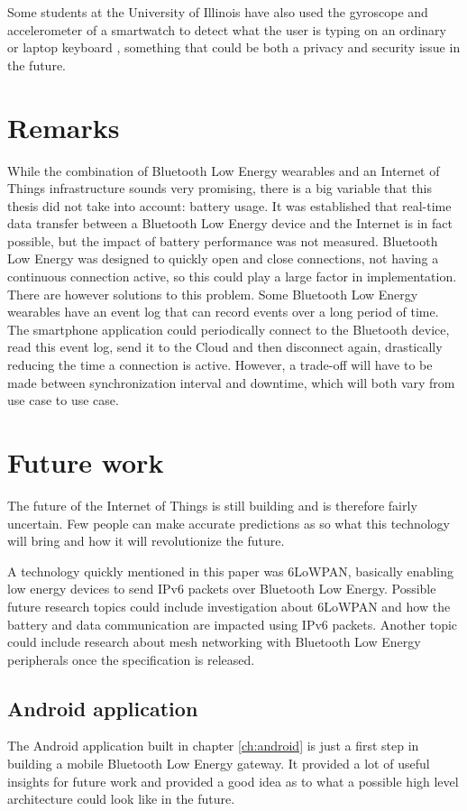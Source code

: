 \documentclass[pdftex,a4paper,12pt,twoside]{report}
\begin{document}
Some students at the University of Illinois have also used the gyroscope and accelerometer of a smartwatch to detect what the user is typing on an ordinary or laptop keyboard \citep{wang2015mole}, something that could be both a privacy and security issue in the future.

\section{Remarks}
\label{sec:remarks}
While the combination of Bluetooth Low Energy wearables and an Internet of Things infrastructure sounds very promising, there is a big variable that this thesis did not take into account: battery usage. It was established that real-time data transfer between a Bluetooth Low Energy device and the Internet is in fact possible, but the impact of battery performance was not measured. Bluetooth Low Energy was designed to quickly open and close connections, not having a continuous connection active, so this could play a large factor in implementation. There are however solutions to this problem. Some Bluetooth Low Energy wearables have an event log that can record events over a long period of time. The smartphone application could periodically connect to the Bluetooth device, read this event log, send it to the Cloud and then disconnect again, drastically reducing the time a connection is active. However, a trade-off will have to be made between synchronization interval and downtime, which will both vary from use case to use case.

\section{Future work}
\label{sec:futurework}
The future of the Internet of Things is still building and is therefore fairly uncertain. Few people can make accurate predictions as so what this technology will bring and how it will revolutionize the future.

A technology quickly mentioned in this paper was 6LoWPAN, basically enabling low energy devices to send IPv6 packets over Bluetooth Low Energy. Possible future research topics could include investigation about 6LoWPAN and how the battery and data communication are impacted using IPv6 packets. Another topic could include research about mesh networking with Bluetooth Low Energy peripherals once the specification is released.

\subsection{Android application}
\label{subsec:androidapp}
The Android application built in chapter \ref{ch:android} is just a first step in building a mobile Bluetooth Low Energy gateway. It provided a lot of useful insights for future work and provided a good idea as to what a possible high level architecture could look like in the future.
\end{document}

